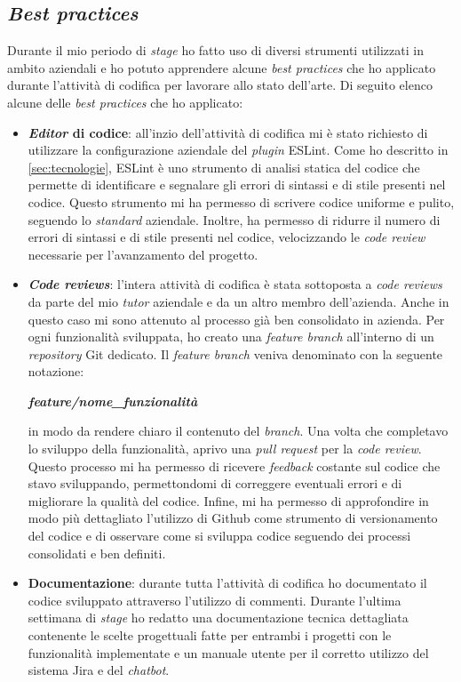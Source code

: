 \subsection{\textit{Best practices}}
Durante il mio periodo di \textit{stage} ho fatto uso di diversi strumenti utilizzati in ambito aziendali e ho potuto apprendere alcune \textit{best practices} che ho applicato durante l'attività di codifica per lavorare allo stato dell'arte. Di seguito elenco alcune delle \textit{best practices} che ho applicato:
\begin{itemize}
    \item \textbf{\textit{Editor} di codice}: all'inzio dell'attività di codifica mi è stato richiesto di utilizzare la configurazione aziendale del \textit{plugin} ESLint. Come ho descritto in \ref{sec:tecnologie}, ESLint è uno strumento di analisi statica del codice che permette di identificare e segnalare gli errori di sintassi e di stile presenti nel codice.  Questo strumento mi ha permesso di scrivere codice uniforme e pulito, seguendo lo \textit{standard} aziendale. Inoltre, ha permesso di ridurre il numero di errori di sintassi e di stile presenti nel codice, velocizzando le \textit{code review} necessarie per l'avanzamento del progetto.
    \item \textbf{\textit{Code reviews}}: l'intera attività di codifica è stata sottoposta a \textit{code reviews} da parte del mio \textit{tutor} aziendale e da un altro membro dell'azienda. Anche in questo caso mi sono attenuto al processo già ben consolidato in azienda. Per ogni funzionalità sviluppata, ho creato una \textit{feature branch} all'interno di un \textit{repository} Git dedicato. Il \textit{feature branch} veniva denominato con la seguente notazione:
    \begin{center}
        \textbf{\emph{feature/nome\_funzionalità}}
    \end{center}
    in modo da rendere chiaro il contenuto del \textit{branch}. Una volta che completavo lo sviluppo della funzionalità, aprivo una \textit{pull request} per la \textit{code review}. Questo processo mi ha permesso di ricevere \textit{feedback} costante sul codice che stavo sviluppando, permettondomi di correggere eventuali errori e di migliorare la qualità del codice. Infine, mi ha permesso di approfondire in modo più dettagliato l'utilizzo di Github come strumento di versionamento del codice e di osservare come si sviluppa codice seguendo dei processi consolidati e ben definiti.
    \item \textbf{Documentazione}: durante tutta l'attività di codifica ho documentato il codice sviluppato attraverso l'utilizzo di commenti. Durante l'ultima settimana di \textit{stage} ho redatto una documentazione tecnica dettagliata contenente le scelte progettuali fatte per entrambi i progetti con le funzionalità implementate e un manuale utente per il corretto utilizzo del sistema Jira e del \textit{chatbot}. 
\end{itemize}

